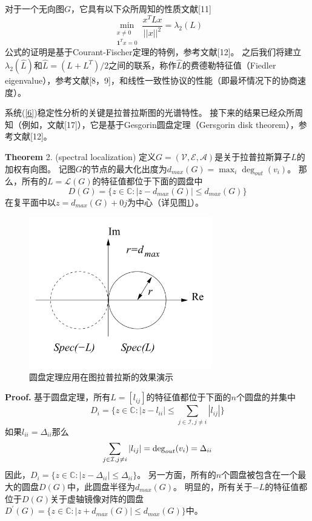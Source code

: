 \documentclass{article}
\begin{document}
对于一个无向图$G$，它具有以下众所周知的性质文献[11]
\begin{equation}
    \min_{\substack{x\ne 0\\   \mathbf{1}^Tx=0}} \frac{x^T Lx}{||x||^2}=\lambda_2(L)
    \tag{14}
    \label{14}
\end{equation}
公式的证明是基于Courant-Fischer定理的特例，参考文献[12]。
之后我们将建立$\lambda_2(\hat{L})$和$\hat{L}=(L+L^T)/2$之间的联系，称作$\hat{L}$的费德勒特征值（Fiedler eigenvalue），参考文献[8，9]，和线性一致性协议的性能（即最坏情况下的协商速度）。

系统(\ref{6})稳定性分析的关键是拉普拉斯图的光谱特性。
接下来的结果已经众所周知（例如，文献[17]），它是基于Gesgorin圆盘定理（Gersgorin disk theorem），参考文献[12]。

\noindent \textbf{Theorem} 2. (spectral localization) 定义$G=(\mathcal{V},\mathcal{E},\mathcal{A})$是关于拉普拉斯算子$L$的加权有向图。
记图$G$的节点的最大化出度为$d_{max}(G) = \max_i \deg_{out}(v_i)$。
那么，所有的$L=\mathcal{L}(G)$的特征值都位于下面的圆盘中
\begin{equation}
    D(G) = \{ z\in \mathbb{C}: |z-d_{max}(G)| \le d_{max}(G) \}
    \tag{15}
    \label{15}
\end{equation}
在复平面中以$z=d_{max}(G)+0j$为中心（详见图\ref{DiskTheorem}）。
\begin{figure}[htbp]
    \centering
    \includegraphics[width=8cm]{figures/Fig1-DiskTheorem.jpeg}
    \caption{圆盘定理应用在图拉普拉斯的效果演示}
    \label{DiskTheorem}
\end{figure}

\noindent \textbf{Proof.} 基于圆盘定理，所有$L=[l_{ij}]$的特征值都位于下面的$n$个圆盘的并集中
\begin{equation}
    D_i = \{ z\in \mathbb{C}: |z-l_{ii}| \le \sum_{j\in \mathcal{I},j\ne i}|l_{ij}| \}
    \tag{16}
    \label{16}
\end{equation}
如果$l_{ii} = \Delta_{ii}$那么
\begin{equation}
    \sum_{j\in \mathcal{I},j\ne i}|l_{ij}|=\deg_{out}(v_i) = \Delta_{ii}
    \notag
\end{equation}
因此，$D_i = \{ z\in \mathbb{C}:|z - \Delta_{ii}| \le \Delta_{ii}\}$。
另一方面，所有的$n$个圆盘被包含在一个最大的圆盘$D(G)$中，此圆盘半径为$d_{max}(G)$。
明显的，所有关于$-L$的特征值都位于$D(G)$关于虚轴镜像对阵的圆盘$D^\prime(G)=\{ z\in \mathbb{C}: |z+d_{max}(G)|\le d_{max}(G)\}$中。
\end{document}
